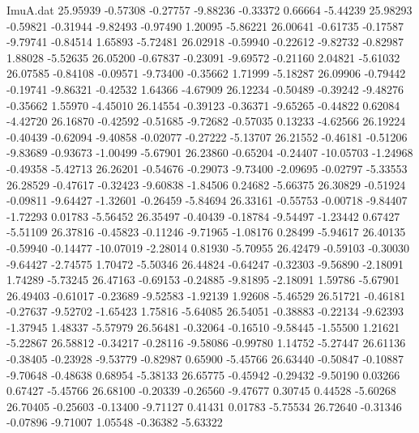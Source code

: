 \begin{filecontents}{ImuA.dat}
  25.95939   -0.57308   -0.27757   -9.88236   -0.33372    0.66664   -5.44239
  25.98293   -0.59821   -0.31944   -9.82493   -0.97490    1.20095   -5.86221
  26.00641   -0.61735   -0.17587   -9.79741   -0.84514    1.65893   -5.72481
  26.02918   -0.59940   -0.22612   -9.82732   -0.82987    1.88028   -5.52635
  26.05200   -0.67837   -0.23091   -9.69572   -0.21160    2.04821   -5.61032
  26.07585   -0.84108   -0.09571   -9.73400   -0.35662    1.71999   -5.18287
  26.09906   -0.79442   -0.19741   -9.86321   -0.42532    1.64366   -4.67909
  26.12234   -0.50489   -0.39242   -9.48276   -0.35662    1.55970   -4.45010
  26.14554   -0.39123   -0.36371   -9.65265   -0.44822    0.62084   -4.42720
  26.16870   -0.42592   -0.51685   -9.72682   -0.57035    0.13233   -4.62566
  26.19224   -0.40439   -0.62094   -9.40858   -0.02077   -0.27222   -5.13707
  26.21552   -0.46181   -0.51206   -9.83689   -0.93673   -1.00499   -5.67901
  26.23860   -0.65204   -0.24407  -10.05703   -1.24968   -0.49358   -5.42713
  26.26201   -0.54676   -0.29073   -9.73400   -2.09695   -0.02797   -5.33553
  26.28529   -0.47617   -0.32423   -9.60838   -1.84506    0.24682   -5.66375
  26.30829   -0.51924   -0.09811   -9.64427   -1.32601   -0.26459   -5.84694
  26.33161   -0.55753   -0.00718   -9.84407   -1.72293    0.01783   -5.56452
  26.35497   -0.40439   -0.18784   -9.54497   -1.23442    0.67427   -5.51109
  26.37816   -0.45823   -0.11246   -9.71965   -1.08176    0.28499   -5.94617
  26.40135   -0.59940   -0.14477  -10.07019   -2.28014    0.81930   -5.70955
  26.42479   -0.59103   -0.30030   -9.64427   -2.74575    1.70472   -5.50346
  26.44824   -0.64247   -0.32303   -9.56890   -2.18091    1.74289   -5.73245
  26.47163   -0.69153   -0.24885   -9.81895   -2.18091    1.59786   -5.67901
  26.49403   -0.61017   -0.23689   -9.52583   -1.92139    1.92608   -5.46529
  26.51721   -0.46181   -0.27637   -9.52702   -1.65423    1.75816   -5.64085
  26.54051   -0.38883   -0.22134   -9.62393   -1.37945    1.48337   -5.57979
  26.56481   -0.32064   -0.16510   -9.58445   -1.55500    1.21621   -5.22867
  26.58812   -0.34217   -0.28116   -9.58086   -0.99780    1.14752   -5.27447
  26.61136   -0.38405   -0.23928   -9.53779   -0.82987    0.65900   -5.45766
  26.63440   -0.50847   -0.10887   -9.70648   -0.48638    0.68954   -5.38133
  26.65775   -0.45942   -0.29432   -9.50190    0.03266    0.67427   -5.45766
  26.68100   -0.20339   -0.26560   -9.47677    0.30745    0.44528   -5.60268
  26.70405   -0.25603   -0.13400   -9.71127    0.41431    0.01783   -5.75534
  26.72640   -0.31346   -0.07896   -9.71007    1.05548   -0.36382   -5.63322

\end{filecontents}
